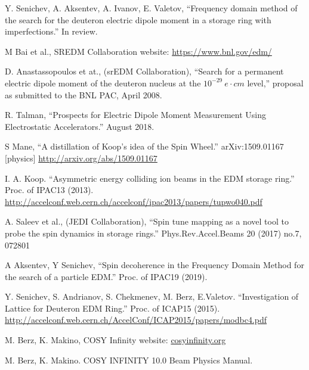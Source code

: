 \documentclass[a4paper]{jacow}
\begin{document}
\begin{thebibliography}{9}

  Y. Senichev, A. Aksentev, A. Ivanov, E. Valetov, ``Frequency domain method of the search for the deuteron electric dipole moment in a storage ring with imperfections.'' In review.

  M Bai et al., SREDM Collaboration website: \url{https://www.bnl.gov/edm/}

  D. Anastassopoulos et at., (srEDM Collaboration), ``Search for a permanent electric dipole moment of the deuteron nucleus at the $10^{-29}~e\cdot cm$ level,'' proposal as submitted to the BNL PAC, April 2008.

  R. Talman, ``Prospects for Electric Dipole Moment Measurement Using Electrostatic Accelerators.'' August 2018.

  S Mane, ``A distillation of Koop's idea of the Spin Wheel.'' arXiv:1509.01167 [physics] \url{http://arxiv.org/abs/1509.01167}

  I. A. Koop. ``Asymmetric energy colliding ion beams in the EDM storage ring.'' Proc. of IPAC13 (2013). \url{http://accelconf.web.cern.ch/accelconf/ipac2013/papers/tupwo040.pdf}

  A. Saleev et al., (JEDI Collaboration), ``Spin tune mapping as a novel tool to probe the spin dynamics in storage rings.'' Phys.Rev.Accel.Beams 20 (2017) no.7, 072801

  A Aksentev, Y Senichev, ``Spin decoherence in the Frequency Domain Method for the search of a particle EDM.'' Proc. of IPAC19 (2019).

  Y. Senichev, S. Andrianov, S. Chekmenev, M. Berz, E.Valetov. ``Investigation of Lattice for Deuteron EDM Ring.''
  Proc. of ICAP15 (2015). \url{http://accelconf.web.cern.ch/AccelConf/ICAP2015/papers/modbc4.pdf}

  M. Berz, K. Makino, COSY Infinity website: \url{cosyinfinity.org}

  M. Berz, K. Makino. COSY INFINITY 10.0 Beam Physics Manual.
  

\end{thebibliography} 
\end{document}
